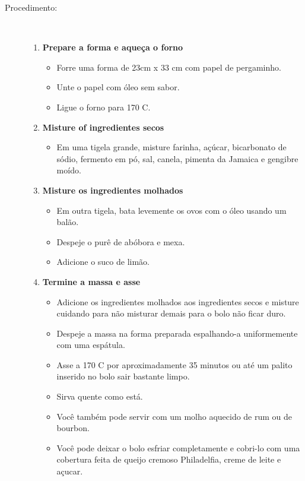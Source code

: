 \documentclass [11pt, letterpaper] {article}
\begin{document}
\begin {description}
\item [Procedimento:] \ \\
\begin {enumerate}
\item {\bf Prepare a forma e aque\c{c}a o forno}
\begin {itemize}
\item Forre uma forma de 23cm x 33 cm com papel de pergaminho.
\item Unte o papel com \'oleo sem sabor.
\item Ligue o forno para 170 C.
\end {itemize}
\item {\bf Misture of ingredientes secos}
\begin {itemize}
\item Em uma tigela grande, misture farinha, açúcar, bicarbonato de sódio, fermento em pó, sal, canela, pimenta da Jamaica e gengibre moído.
\end {itemize}
\item {\bf Misture os ingredientes molhados}
\begin {itemize}
        \item Em outra tigela, bata levemente os ovos com o óleo usando um bal\~ao.
\item Despeje o purê de abóbora e mexa.
\item Adicione o suco de limão.
\end {itemize}
\item {\bf Termine a massa e asse}
\begin {itemize}
\item Adicione os ingredientes molhados aos ingredientes secos e misture cuidando para n\~ao misturar demais para o bolo n\~ao ficar duro.
\item Despeje a massa na forma preparada espalhando-a uniformemente com uma espátula.
\item Asse a 170 C por aproximadamente 35 minutos ou até um palito inserido no bolo sair bastante limpo.
\item Sirva quente como está.
\item Você também pode servir com um molho aquecido de rum ou de bourbon.
\item Você pode deixar o bolo esfriar completamente e cobri-lo com uma cobertura feita de queijo cremoso Philadelfia, creme de leite e a\c{c}ucar.  
 \end {itemize}
     \end {enumerate}
\end {description}
\end{document}
